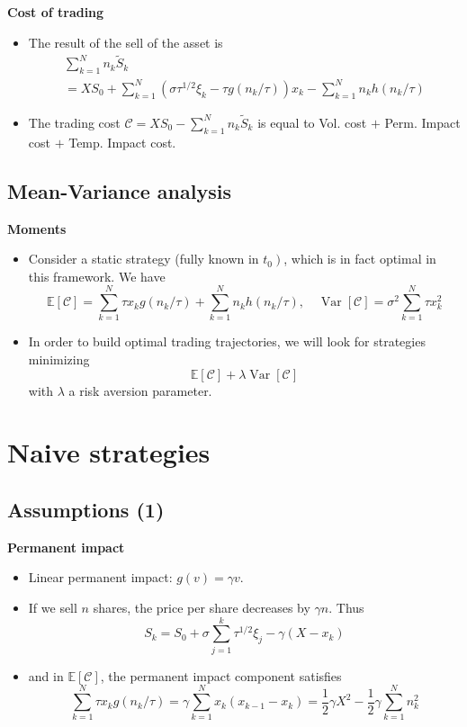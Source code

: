 \documentclass[10pt]{article}
\begin{document}
\textbf{Cost of trading}

\begin{itemize} 
    \item The result of the sell of the asset is
    $$
    \begin{array}{c}
    \sum_{k=1}^{N} n_{k} \tilde{S}_{k} \\
    =X S_{0}+\sum_{k=1}^{N}\left(\sigma \tau^{1 / 2} \xi_{k}-\tau g\left(n_{k} / \tau\right)\right) x_{k}-\sum_{k=1}^{N} n_{k} h\left(n_{k} / \tau\right)
    \end{array}
    $$
    \item The trading cost $\mathcal{C}=X S_{0}-\sum_{k=1}^{N} n_{k} \tilde{S}_{k}$ is equal to
    Vol. cost $+$ Perm. Impact cost $+$ Temp. Impact cost.
\end{itemize}

\subsection{Mean-Variance analysis}

\textbf{Moments}

\begin{itemize} 
    \item Consider a static strategy (fully known in $\left.t_{0}\right)$, which is in fact optimal in this framework. We have
    $$
    \mathbb{E}[\mathcal{C}]=\sum_{k=1}^{N} \tau x_{k} g\left(n_{k} / \tau\right)+\sum_{k=1}^{N} n_{k} h\left(n_{k} / \tau\right), \quad \operatorname{Var}[\mathcal{C}]=\sigma^{2} \sum_{k=1}^{N} \tau x_{k}^{2}
    $$
    \item In order to build optimal trading trajectories, we will look for strategies minimizing
    $$
    \mathbb{E}[\mathcal{C}]+\lambda \operatorname{Var}[\mathcal{C}]
    $$
    with $\lambda$ a risk aversion parameter.
\end{itemize}

\section{Naive strategies}

\subsection{Assumptions (1)}

\textbf{Permanent impact}

\begin{itemize} 
    \item Linear permanent impact: $g(v)=\gamma v$.
    \item If we sell $n$ shares, the price per share decreases by $\gamma n .$ Thus
    $$
    S_{k}=S_{0}+\sigma \sum_{j=1}^{k} \tau^{1 / 2} \xi_{j}-\gamma\left(X-x_{k}\right)
    $$
    \item and in $\mathbb{E}[\mathcal{C}]$, the permanent impact component satisfies
    $$
    \sum_{k=1}^{N} \tau x_{k} g\left(n_{k} / \tau\right)=\gamma \sum_{k=1}^{N} x_{k}\left(x_{k-1}-x_{k}\right)=\frac{1}{2} \gamma X^{2}-\frac{1}{2} \gamma \sum_{k=1}^{N} n_{k}^{2}
    $$
\end{itemize}
\end{document}
